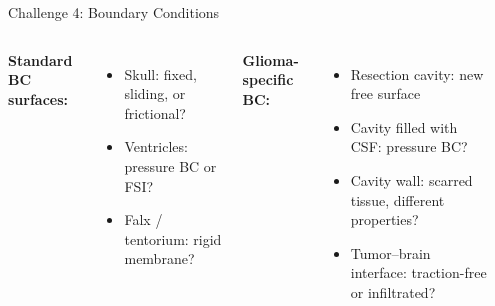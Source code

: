 \begin{frame}{Challenge 4: Boundary Conditions}

  \begin{columns}[T]
    \textbf{Standard BC surfaces:}
    \begin{itemize}
      \item Skull: fixed, sliding, or frictional?
      \item Ventricles: pressure BC or FSI?
      \item Falx / tentorium: rigid membrane?
    \end{itemize}

    \bigskip

    \textbf{Glioma-specific BC:}
    \begin{itemize}
      \item \alert{Resection cavity}: new free surface
      \item Cavity filled with CSF: pressure BC?
      \item Cavity wall: scarred tissue, different properties?
      \item Tumor--brain interface: traction-free or infiltrated?
    \end{itemize}

    \begin{center}
    \end{center}
  \end{columns}

\end{frame}

